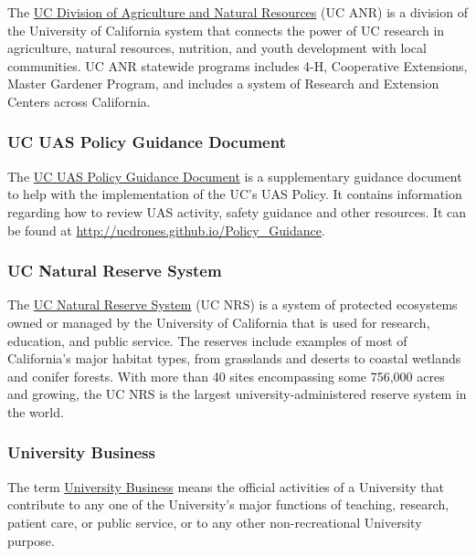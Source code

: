 \documentclass[
]{book}
\begin{document}
The \protect\hyperlink{ANR}{UC Division of Agriculture and Natural Resources} (UC ANR) is a division of the University of California system that connects the power of UC research in agriculture, natural resources, nutrition, and youth development with local communities. UC ANR statewide programs includes 4-H, Cooperative Extensions, Master Gardener Program, and includes a system of Research and Extension Centers across California.



\hypertarget{UASPGD}{%
\subsubsection*{UC UAS Policy Guidance Document}\label{UASPGD}}

The \protect\hyperlink{UASPGD}{UC UAS Policy Guidance Document} is a supplementary guidance document to help with the implementation of the UC's UAS Policy. It contains information regarding how to review UAS activity, safety guidance and other resources. It can be found at \url{http://ucdrones.github.io/Policy_Guidance}.



\hypertarget{NRS}{%
\subsubsection*{UC Natural Reserve System}\label{NRS}}

The \protect\hyperlink{NRS}{UC Natural Reserve System} (UC NRS) is a system of protected ecosystems owned or managed by the University of California that is used for research, education, and public service. The reserves include examples of most of California's major habitat types, from grasslands and deserts to coastal wetlands and conifer forests. With more than 40 sites encompassing some 756,000 acres and growing, the UC NRS is the largest university-administered reserve system in the world.



\hypertarget{UB}{%
\subsubsection*{University Business}\label{UB}}

The term \protect\hyperlink{UB}{University Business} means the official activities of a University that contribute to any one of the University's major functions of teaching, research, patient care, or public service, or to any other non-recreational University purpose.
\end{document}
